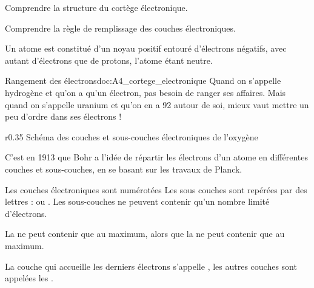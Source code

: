 \teteSndAtom

\vspace*{-36pt}

\begin{objectifs}
  \item Comprendre la structure du cortège électronique.
  \item Comprendre la règle de remplissage des couches électroniques.
\end{objectifs}

\begin{contexte}
  Un atome est constitué d'un noyau positif entouré d'électrons négatifs, avec autant d'électrons que de protons, l'atome étant neutre.
  
\end{contexte}


\begin{doc}{Rangement des électrons}{doc:A4_cortege_electronique}
  Quand on s'appelle hydrogène et qu'on a qu'un électron, pas besoin de ranger ses affaires.
  Mais quand on s'appelle uranium et qu'on en a 92 autour de soi, mieux vaut mettre un peu d'ordre dans ses électrons !
  
  \begin{wrapfigure}{r}{0.35\linewidth}
    \centering
    \vspace*{-24pt}
    {\small Schéma des couches et sous-couches électroniques de l'oxygène }
  \end{wrapfigure}
  
  C'est en 1913 que Bohr a l'idée de répartir les électrons d'un atome en différentes couches et sous-couches, en se basant sur les travaux de Planck.
  
  Les couches électroniques sont numérotées 
  Les sous couches sont repérées par des lettres :  ou .
  Les sous-couches ne peuvent contenir qu'un nombre limité d'électrons.

  \begin{importants}  
    La  ne peut contenir que  au maximum,
    alors que la  ne peut contenir que  au maximum.
  \end{importants}
  
  La couche qui accueille les derniers électrons s'appelle , les autres couches sont appelées les .
\end{doc}

